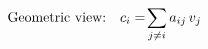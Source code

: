 \documentclass[preview]{standalone}
\begin{document}
\begin{align*}
\special{dvisvgm:raw <g id='unique000'>}\text{Geometric view:}\quad c_i = \!\sum_{j \ne i} a_{ij}\, v_j\special{dvisvgm:raw </g>}
\end{align*}
\end{document}

